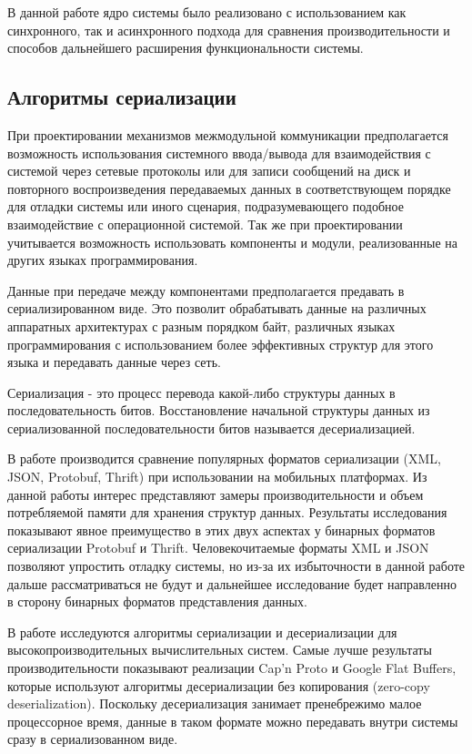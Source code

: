 В данной работе ядро системы было реализовано с использованием 
как синхронного, так и асинхронного подхода для сравнения 
производительности и способов дальнейшего расширения 
функциональности системы.

\subsection{Алгоритмы сериализации}

При проектировании механизмов межмодульной коммуникации предполагается возможность использования системного ввода/вывода для взаимодействия с системой через сетевые протоколы или для записи сообщений на диск и повторного воспроизведения передаваемых данных в соответствующем порядке для отладки системы или иного сценария, подразумевающего подобное взаимодействие с операционной системой. Так же при проектировании учитывается возможность использовать компоненты и модули, реализованные на других языках программирования.

Данные при передаче между компонентами предполагается предавать 
в сериализированном виде. Это позволит обрабатывать данные на 
различных аппаратных архитектурах с разным порядком байт, 
различных языках программирования с использованием более 
эффективных структур для этого языка и передавать данные через 
сеть.

Сериализация - это процесс перевода какой-либо структуры данных в последовательность битов. Восстановление начальной структуры данных из сериализованной последовательности битов называется десериализацией.

В работе \cite{sumaray2012comparison} производится сравнение популярных форматов сериализации (XML, JSON, Protobuf, Thrift) при использовании на мобильных платформах. Из данной работы интерес представляют замеры производительности и объем потребляемой памяти для хранения структур данных. Результаты исследования показывают явное преимущество в этих двух аспектах у бинарных форматов сериализации Protobuf и Thrift. Человекочитаемые форматы XML и JSON позволяют упростить отладку системы, но из-за их избыточности в данной работе дальше рассматриваться не будут и дальнейшее исследование будет направленно в сторону бинарных форматов представления данных.

В работе \cite{zaluzhnyi2016serialization} исследуются алгоритмы сериализации и десериализации для высокопроизводительных вычислительных систем. Самые лучше результаты производительности показывают реализации Cap'n Proto и Google Flat Buffers, которые используют алгоритмы десериализации без копирования (zero-copy deserialization). Поскольку десериализация занимает пренебрежимо малое процессорное время, данные в таком формате можно передавать внутри системы сразу в сериализованном виде.

